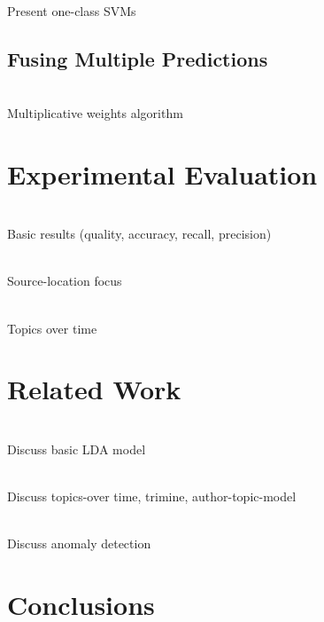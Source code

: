 \documentclass{sig-alternate}
\begin{document}
\ \\Present one-class SVMs

\subsection{Fusing Multiple Predictions}
\label{sec:integration}

\ \\Multiplicative weights algorithm

\section{Experimental Evaluation}
\label{sec:exp}

\ \\Basic results (quality, accuracy, recall, precision)

\ \\Source-location focus

\ \\Topics over time

\section{Related Work}
\label{sec:related_work}

\ \\Discuss basic LDA model

\ \\Discuss topics-over time, trimine, author-topic-model

\ \\Discuss anomaly detection


\section{Conclusions}
\label{sec:conclusion}



\end{document}
